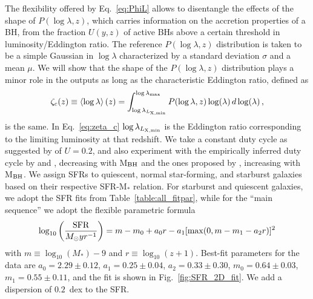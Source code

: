 The flexibility offered by Eq.~\ref{eq:PhiL} allows to disentangle the effects of the shape of $P(\log \lambda,z)$, which carries information on the accretion properties of a BH, from the fraction $U(y,z)$ of active BHs above a certain threshold in luminosity/Eddington ratio. The reference $P(\log \lambda,z)$ distribution is taken to be a simple Gaussian in $\log \lambda$ characterized by a standard deviation $\sigma$ and a mean $\mu$. We will show that the shape of the $P(\log \lambda,z)$ distribution plays a minor role in the outputs as long as the characteristic Eddington ratio, defined as
\begin{equation}
\zeta_c(z)\equiv\left<\log \lambda\right>(z)=\int_{\log\lambda_{L_{\rm X,min}}}^{\log \lambda_{\rm max}} P(\log\lambda,z)\log(\lambda) \,d\log(\lambda)\, ,
\label{eq:zeta_c}
\end{equation}
is the same. In Eq.~\ref{eq:zeta_c} $\log\lambda_{L_{\rm X,min}}$ is the Eddington ratio corresponding to the limiting luminosity at that redshift.
We take a constant duty cycle as suggested by \citet{goulding10} of $U=0.2$, and also experiment with the empirically inferred duty cycle by \citet{2010A&A...516A..87S} and \citet{2015MNRAS.447.2085S}, decreasing with M$_{\rm BH}$ and the ones proposed by \citet{2019MNRAS.488...89M}, increasing with M$_{\rm BH}$. 
We assign SFRs to quiescent, normal star-forming, and starburst galaxies based on their respective SFR-M$_*$ relation.
For starburst and quiescent galaxies, we adopt the SFR fits from Table~\ref{table:all_fitpar}, while for the ``main sequence'' we adopt the 
\citet[Eq.~9]{2015A&A...575A..74S} flexible parametric formula
\begin{equation}
    \log_{10}\left(\frac{\rm SFR}{M_\odot yr^{-1}}\right)= m - m_0 +a_0 r - a_1[\max(0,m-m_1-a_2r)]^2
	\label{eq:SFR}
\end{equation}
with $m\equiv\log_{10}(M_*)-9$ and $r\equiv\log_{10}(z+1)$. Best-fit parameters for the data are $a_0=2.29\pm 0.12$, $a_1=0.25 \pm 0.04$, $a_2=0.33 \pm 0.30$, $m_0=0.64 \pm 0.03$, $m_1=0.55\pm 0.11$, and the fit is shown in Fig.~\ref{fig:SFR_2D_fit}. We add a dispersion of $0.2$~dex to the SFR. 
